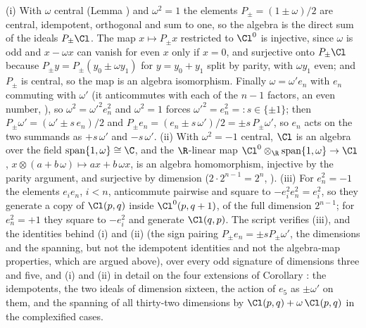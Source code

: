 (i) With $\omega$ central (Lemma ) and $\omega^{2} = 1$ the elements $P_{\pm} = (1 \pm \omega)/2$ are central, idempotent, orthogonal and sum to one, so the algebra is the direct sum of the ideals $P_{\pm}\Cl$. The map $x \mapsto P_{\pm}x$ restricted to $\Cl^{0}$ is injective, since $\omega$ is odd and $x - \omega x$ can vanish for even $x$ only if $x = 0$, and surjective onto $P_{\pm}\Cl$ because $P_{\pm}y = P_{\pm}(y_{0} \pm \omega y_{1})$ for $y = y_{0} + y_{1}$ split by parity, with $\omega y_{1}$ even; and $P_{\pm}$ is central, so the map is an algebra isomorphism. Finally $\omega = \omega' e_{n}$ with $e_{n}$ commuting with $\omega'$ (it anticommutes with each of the $n - 1$ factors, an even number, ), so $\omega^{2} = \omega'^{2}e_{n}^{2}$ and $\omega^{2} = 1$ forces $\omega'^{2} = e_{n}^{2} =: s \in \{\pm 1\}$; then $P_{\pm}\omega' = (\omega' \pm s\,e_{n})/2$ and $P_{\pm}e_{n} = (e_{n} \pm s\,\omega')/2 = \pm s\,P_{\pm}\omega'$, so $e_{n}$ acts on the two summands as $+s\,\omega'$ and $-s\,\omega'$. (ii) With $\omega^{2} = -1$ central, $\Cl$ is an algebra over the field $\mathrm{span}\{1, \omega\} \cong \C$, and the $\R$-linear map $\Cl^{0} \otimes_{\R} \mathrm{span}\{1, \omega\} \to \Cl$, $x \otimes (a + b\,\omega) \mapsto ax + b\,\omega x$, is an algebra homomorphism, injective by the parity argument, and surjective by dimension ($2 \cdot 2^{n-1} = 2^{n}$, ). (iii) For $e_{n}^{2} = -1$ the elements $e_{i}e_{n}$, $i < n$, anticommute pairwise and square to $-e_{i}^{2}e_{n}^{2} = e_{i}^{2}$, so they generate a copy of $\Cl(p,q)$ inside $\Cl^{0}(p, q+1)$, of the full dimension $2^{n-1}$; for $e_{n}^{2} = +1$ they square to $-e_{i}^{2}$ and generate $\Cl(q,p)$. The script verifies (iii), and the identities behind (i) and (ii) (the sign pairing $P_{\pm}e_{n} = \pm s P_{\pm}\omega'$, the dimensions and the spanning, but not the idempotent identities and not the algebra-map properties, which are argued above), over every odd signature of dimensions three and five, and (i) and (ii) in detail on the four extensions of Corollary : the idempotents, the two ideals of dimension sixteen, the action of $e_{5}$ as $\pm\omega'$ on them, and the spanning of all thirty-two dimensions by $\Cl(p,q) + \omega\,\Cl(p,q)$ in the complexified cases.
